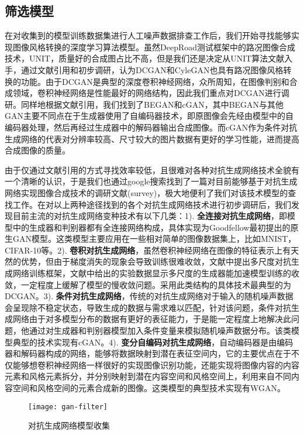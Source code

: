 \subsection{筛选模型}

在对收集到的模型训练数据集进行人工噪声数据排查工作后，我们开始寻找能够实现图像风格转换的深度学习算法模型。虽然DeepRoad测试框架中的路况图像合成技术，UNIT，质量好的合成图占比不高，但是我们还是决定从UNIT算法文献\cite{UNIT}入手，通过文献引用和初步调研，认为DCGAN和CyleGAN也具有路况图像风格转换的功能。由于DCGAN是典型的深度卷积神经网络，众所周知，在图像判别和合成领域，卷积神经网络是性能最好的网络结构，因此我们重点对DCGAN进行调研。同样地根据文献引用，我们找到了BEGAN\cite{BEGAN}和cGAN\cite{cGAN}，其中BEGAN与其他GAN主要不同点在于生成器使用了自编码器技术，即原图像会先经由模型中的自编码器处理，然后再经过生成器中的解码器输出合成图像。而cGAN\cite{cGAN}作为条件对抗生成网络的代表对分辨率较高、尺寸较大的图片数据有更好的学习性能，进而提高合成图像的质量。

由于仅通过文献引用的方式寻找效率较低，且很难对各种对抗生成网络技术全貌有一个清晰的认识，于是我们也通过google搜索找到了一篇对目前能够基于对抗生成网络实现图像合成技术的调研文献(survey)\cite{gan-survey}，极大地便利了我们对该技术模型的查找工作。在对以上两种途径找到的各个对抗生成网络技术进行初步调研后，我们发现目前主流的对抗生成网络变种技术有以下几类：1). \textbf{全连接对抗生成网络}，即模型中的生成器和判别器都有全连接网络构成，具体实现为Goodfellow最初提出的原生GAN模型。这类模型主要应用在一些相对简单的图像数据集上，比如MNIST，CIFAR-10等。2). \textbf{卷积对抗生成网络}，虽然卷积神经网络在图像的特征表示上有天然的优势，但由于梯度消失的现象会导致训练很难收敛，文献\cite{LAPGAN}中提出多尺度对抗生成网络训练框架，文献中给出的实验数据显示多尺度的生成器能加速模型训练的收敛，一定程度上缓解了模型的慢收敛问题。采用此类结构的具体技术最典型的为DCGAN\cite{dcgan}。3). \textbf{条件对抗生成网络}，传统的对抗生成网络对于输入的随机噪声数据会呈现除不稳定状态，导致生成的数据与需求难以匹配，针对该问题，条件对抗生成网络由于对多模型分布的数据有更好的表征能力，于是能一定程度上地解决此问题，他通过对生成器和判别器模型加入条件变量来模拟随机噪声数据分布。该类模型典型的技术实现有cGAN\cite{cGAN}。4). \textbf{变分自编码对抗生成网络}，自动编码器是由编码器和解码器构成的网络，能够将数据映射到潜在表征空间内，它的主要优点在于不仅能够想卷积神经网络一样很好的实现图像识别功能，还能实现将图像内容的内容元素和风格元素拆分，并分别映射到潜在内容空间和风格空间上，利用来自不同内容空间和风格空间的元素合成新的图像。这类模型的典型技术实现有WGAN\cite{WGAN}。

\begin{figure}[h]
    \centering
    \texttt{[image: gan-filter]}
    \caption{对抗生成网络模型收集}
    \label{gan-filter}
\end{figure}

